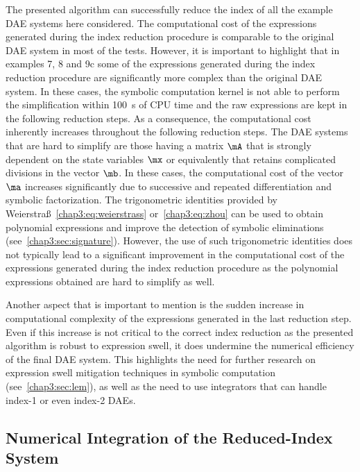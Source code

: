 The presented algorithm can successfully reduce the index of all the example \ac{DAE} systems here considered. The computational cost of the expressions generated during the index reduction procedure is comparable to the original \ac{DAE} system in most of the tests. However, it is important to highlight that in examples 7, 8 and 9c some of the expressions generated during the index reduction procedure are significantly more complex than the original \ac{DAE} system. In these cases, the \Maple{} symbolic computation kernel is not able to perform the simplification within \SI{100}{\second} of CPU time and the raw expressions are kept in the following reduction steps. As a consequence, the computational cost inherently increases throughout the following reduction steps. The \ac{DAE} systems that are hard to simplify are those having a matrix $\mA$ that is strongly dependent on the state variables $\mx$ or equivalently that retains complicated divisions in the vector $\mb$. In these cases, the computational cost of the vector $\ma$ increases significantly due to successive and repeated differentiation and symbolic factorization. The trigonometric identities provided by Weierstra{\ss}~\eqref{chap3:eq:weierstrass} or~\eqref{chap3:eq:zhou} can be used to obtain polynomial expressions and improve the detection of symbolic eliminations (see~\ref{chap3:sec:signature}). However, the use of such trigonometric identities does not typically lead to a significant improvement in the computational cost of the expressions generated during the index reduction procedure as the polynomial expressions obtained are hard to simplify as well.

Another aspect that is important to mention is the sudden increase in computational complexity of the expressions generated in the last reduction step. Even if this increase is not critical to the correct index reduction as the presented algorithm is robust to expression swell, it does undermine the numerical efficiency of the final \ac{DAE} system. This highlights the need for further research on expression swell mitigation techniques in symbolic computation (see~\ref{chap3:sec:lem}), as well as the need to use integrators that can handle index-1 or even index-2 \acp{DAE}.





\subsection{Numerical Integration of the Reduced-Index System}
\label{chap3:sec:numerical_integration}

